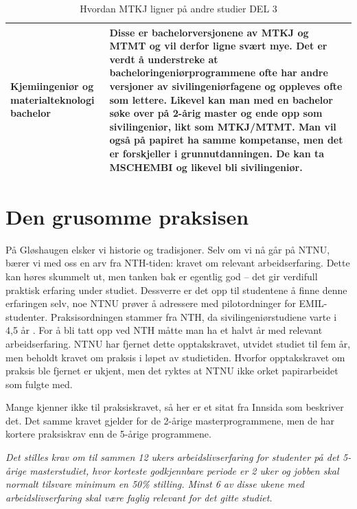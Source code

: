 \begin{table}[H]
\begin{tabular}{p{3cm}p{10cm}}
        Kjemiingeniør og materialteknologi bachelor & Disse er bachelorversjonene av MTKJ og MTMT og vil derfor ligne svært mye. Det er verdt å understreke at bacheloringeniørprogrammene ofte har andre versjoner av sivilingeniørfagene og oppleves ofte som lettere. Likevel kan man med en bachelor søke over på 2-årig master og ende opp som sivilingeniør, likt som MTKJ/MTMT. Man vil også på papiret ha samme kompetanse, men det er forskjeller i grunnutdanningen. De kan ta MSCHEMBI og likevel bli sivilingeniør. \\
        \bottomrule
    \end{tabular}
    \caption{Hvordan MTKJ ligner på andre studier DEL 3}
    \label{tab:AndreStudierDel3}
\end{table}



\section{Den grusomme praksisen}

På Gløshaugen elsker vi historie og tradisjoner. Selv om vi nå går på NTNU, bærer vi med oss en arv fra NTH-tiden: kravet om relevant arbeidserfaring. Dette kan høres skummelt ut, men tanken bak er egentlig god – det gir verdifull praktisk erfaring under studiet. Dessverre er det opp til studentene å finne denne erfaringen selv, noe NTNU prøver å adressere med pilotordninger for EMIL-studenter. Praksisordningen stammer fra NTH, da sivilingeniørstudiene varte i 4,5 år \cite{Praksis45}. For å bli tatt opp ved NTH måtte man ha et halvt år med relevant arbeidserfaring. NTNU har fjernet dette opptakskravet, utvidet studiet til fem år, men beholdt kravet om praksis i løpet av studietiden. Hvorfor opptakskravet om praksis ble fjernet er ukjent, men det ryktes at NTNU ikke orket papirarbeidet som fulgte med.

Mange kjenner ikke til praksiskravet, så her er et sitat fra Innsida \cite{PraksisNTNU} som beskriver det. Det samme kravet gjelder for de 2-årige masterprogrammene, men de har kortere praksiskrav enn de 5-årige programmene.

\begin{center}
    \begin{minipage}{0.8\textwidth}
        \begin{outline}
            \textit{Det stilles krav om til sammen 12 ukers arbeidslivserfaring for studenter på det 5-årige masterstudiet, hvor korteste godkjennbare periode er 2 uker og jobben skal normalt tilsvare minimum en 50\% stilling. Minst 6 av disse ukene med arbeidslivserfaring skal være faglig relevant for det gitte studiet.}
        \end{outline}
    \end{minipage}
\end{center}

